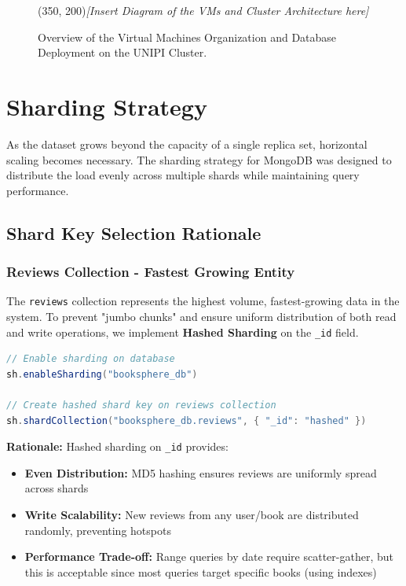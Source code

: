 \begin{figure}[H]
    \centering
    
    \framebox(350, 200){\textit{[Insert Diagram of the VMs and Cluster Architecture here]}}
    
    \caption{Overview of the Virtual Machines Organization and Database Deployment on the UNIPI Cluster.}
    \label{fig:vm_organization}
\end{figure}

\section{Sharding Strategy}
As the dataset grows beyond the capacity of a single replica set, horizontal scaling becomes necessary. The sharding strategy for MongoDB was designed to distribute the load evenly across multiple shards while maintaining query performance.

\subsection{Shard Key Selection Rationale}

\subsubsection{Reviews Collection - Fastest Growing Entity}
The \texttt{reviews} collection represents the highest volume, fastest-growing data in the system. To prevent "jumbo chunks" and ensure uniform distribution of both read and write operations, we implement \textbf{Hashed Sharding} on the \texttt{\_id} field.

\begin{lstlisting}[language=Java, caption={Sharding Configuration for Reviews}]
// Enable sharding on database
sh.enableSharding("booksphere_db")

// Create hashed shard key on reviews collection
sh.shardCollection("booksphere_db.reviews", { "_id": "hashed" })
\end{lstlisting}

\textbf{Rationale:} Hashed sharding on \texttt{\_id} provides:
\begin{itemize}
    \item \textbf{Even Distribution:} MD5 hashing ensures reviews are uniformly spread across shards
    \item \textbf{Write Scalability:} New reviews from any user/book are distributed randomly, preventing hotspots
    \item \textbf{Performance Trade-off:} Range queries by date require scatter-gather, but this is acceptable since most queries target specific books (using indexes)
\end{itemize}

